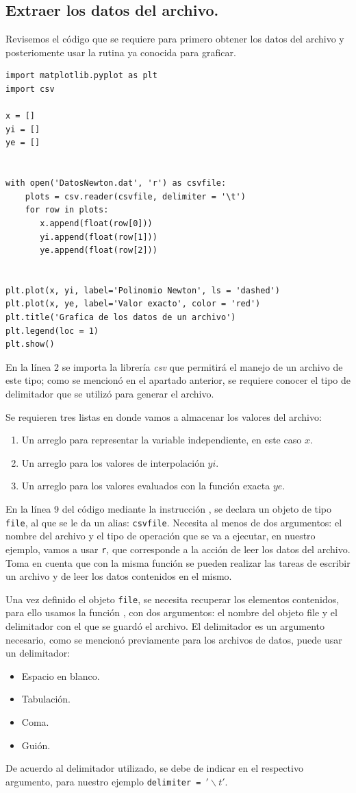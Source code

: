 \subsection{Extraer los datos del archivo.}
Revisemos el código que se requiere para primero obtener los datos del archivo y posteriomente usar la rutina ya conocida para graficar.
\begin{lstlisting}[style= FormattedNumber, basicstyle=\linespread{1.1}\ttfamily=\normal, columns=fullflexible]
import matplotlib.pyplot as plt
import csv

x = []
yi = []
ye = []


with open('DatosNewton.dat', 'r') as csvfile:
    plots = csv.reader(csvfile, delimiter = '\t')
    for row in plots:
       x.append(float(row[0]))
       yi.append(float(row[1]))
       ye.append(float(row[2]))
       

plt.plot(x, yi, label='Polinomio Newton', ls = 'dashed')
plt.plot(x, ye, label='Valor exacto', color = 'red')
plt.title('Grafica de los datos de un archivo')
plt.legend(loc = 1)
plt.show()
\end{lstlisting}
En la línea 2 se importa la librería \emph{csv} que permitirá el manejo de un archivo de este tipo; como se mencionó en el apartado anterior, se requiere conocer el tipo de delimitador que se utilizó para generar el archivo.
\par
Se requieren tres listas en donde vamos a almacenar los valores del archivo:
\begin{enumerate}
\item Un arreglo para representar la variable independiente, en este caso $x$.
\item Un arreglo para los valores de interpolación $yi$.
\item Un arreglo para los valores evaluados con la función exacta $ye$.
\end{enumerate}
En la línea 9 del código mediante la instrucción , se declara un objeto de tipo \texttt{file}, al que se le da un alias: \texttt{csvfile}. Necesita al menos de dos argumentos: el nombre del archivo y el tipo de operación que se va a ejecutar, en nuestro ejemplo, vamos a usar \texttt{r}, que corresponde a la acción de leer los datos del archivo. Toma en cuenta que con la misma función 	se pueden realizar las tareas de escribir un archivo y de leer los datos contenidos en el mismo.
\par
Una vez definido el objeto \texttt{file}, se necesita recuperar los elementos contenidos, para ello usamos la función , con dos argumentos: el nombre del objeto file y el delimitador con el que se guardó el archivo. El delimitador es un argumento necesario, como se mencionó previamente para los archivos de datos, puede usar un delimitador:
\begin{itemize}
\item Espacio en blanco.
\item Tabulación.
\item Coma.
\item Guión.
\end{itemize}
De acuerdo al delimitador utilizado, se debe de indicar en el respectivo argumento, para nuestro ejemplo \texttt{delimiter = $'\backslash t'$}.
